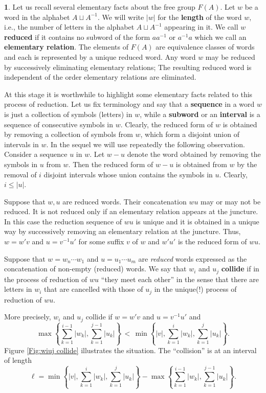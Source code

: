 \documentclass[12pt]{amsart}
\theoremstyle{definition}
\newtheorem{void}[prop]{}
\def\Free{F}
\begin{document}
\begin{void}
Let us recall several elementary facts about the free group $\Free(A)$.
Let $w$ be a word in the alphabet $A \sqcup A^{-1}$.
We will write $|w|$ for the {\bf length} of the word $w$, i.e., the number of letters in the alphabet $A \sqcup A^{-1}$ appearing in it.
We call $w$ {\bf reduced} if it contains no subword of the form $aa^{-1}$ or $a^{-1}a$ which we call an {\bf elementary relation}.
The elements of $\Free(A)$ are equivalence classes of words and each is represented by a unique reduced word.
Any word $w$ may be reduced by successively eliminating elementary relations; The resulting reduced word is independent of the order elementary relations are eliminated.

At this stage it is worthwhile to highlight some elementary facts related to this process of reduction.
Let us fix terminology and say that a {\bf sequence} in a word $w$ is just a collection of symbols (letters) in $w$, while a {\bf subword} or an {\bf interval} is a sequence of consecutive symbols in $w$.
Clearly, the reduced form of $w$ is obtained by removing a collection of symbols from $w$, which form a disjoint union of intervals in $w$.
In the sequel we will use repeatedly the following observation.
Consider a sequence $u$ in $w$.
Let $w-u$ denote the word obtained by removing the symbols in $u$ from $w$.
Then the reduced form of $w-u$ is obtained from $w$ by the removal of $i$ disjoint intervals whose union contains the symbols in $u$.
Clearly, $i \leq |u|$.


Suppose that  $w,u$ are reduced words.
Their concatenation $wu$ may or may not be reduced.
It is not reduced only if an elementary relation appears at the juncture.
In this case the reduction sequence of $wu$ is unique and it is obtained in a unique way by successively removing an elementary relation at the juncture. 
Thus, $w=w'v$ and $u=v^{-1}u'$ for some suffix $v$ of $w$ and $w'u'$ is the reduced form of $wu$.

Suppose that $w=w_n\cdots w_1$ and $u=u_1\cdots u_m$ are {\em reduced} words expressed as the concatenation of non-empty (reduced) words.
We say that $w_i$ and $u_j$ {\bf collide} if in the process of reduction of $wu$ ``they meet each other'' in the sense that there are letters in $w_i$ that are cancelled with those of $u_j$ in the unique(!) process of reduction of $wu$.

More precisely, $w_i$ and $u_j$ collide if $w=w'v$ and $u=v^{-1}u'$ and
\[
\max\left\{ \sum_{k=1}^{i-1} |w_k| , \sum_{k=1}^{j-1}|u_k| \right\} \, <  \,
\min\left\{ |v|, \sum_{k=1}^{i} |w_k| , \sum_{k=1}^{j}|u_k| \right\}.
\]
Figure \ref{Fig:wiuj collide} illustrates the situation.
The ``collision'' is at an interval of length 
\[
\ell = \min\left\{ |v|, \sum_{k=1}^{i} |w_k| , \sum_{k=1}^{j}|u_k| \right\} - \max\left\{ \sum_{k=1}^{i-1} |w_k| , \sum_{k=1}^{j-1}|u_k| \right\}.
\]


\end{void}
\end{document}
